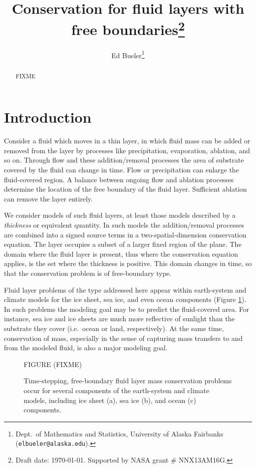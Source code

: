 \documentclass[final,leqno,onefignum,onetabnum]{siamltex1213bueler}
\title{Conservation for fluid layers with free boundaries\thanks{Draft date: \today.  Supported by NASA grant \# NNX13AM16G.}}
\author{Ed Bueler\thanks{Dept.~of Mathematics and Statistics, University of Alaska Fairbanks (\texttt{elbueler@alaska.edu}).}}
\begin{document}
\maketitle
{}

\begin{abstract}
FIXME
\end{abstract}


\pagestyle{myheadings}
\thispagestyle{plain}


\section{Introduction}  \label{sec:intro}

Consider a fluid which moves in a thin layer, in which fluid mass can be added or removed from the layer by processes like precipitation, evaporation, ablation, and so on.  Through flow and these addition/removal processes the area of substrate covered by the fluid can change in time.  Flow or precipitation can enlarge the fluid-covered region.  A balance between ongoing flow and ablation processes determine the location of the free boundary of the fluid layer.  Sufficient ablation can remove the layer entirely.

We consider models of such fluid layers, at least those models described by a \emph{thickness} or equivalent quantity.  In such models the addition/removal processes are combined into a signed source terms in a two-spatial-dimension conservation equation.  The layer occupies a subset of a larger fixed region of the plane.  The domain where the fluid layer is present, thus where the conservation equation applies, is the set where the thickness is positive.  This domain changes in time, so that the conservation problem is of free-boundary type.

Fluid layer problems of the type addressed here appear within earth-system and climate models for the ice sheet, sea ice, and even ocean components (Figure \ref{fig:climatepictures}).  In such problems the modeling goal may be to predict the fluid-covered area.  For instance, sea ice and ice sheets are much more reflective of sunlight than the substrate they cover (i.e.~ocean or land, respectively).  At the same time, conservation of mass, especially in the sense of capturing mass transfers to and from the modeled fluid, is also a major modeling goal.

\begin{figure}[ht]
\begin{center}
FIGURE (FIXME)
\end{center}
\caption{Time-stepping, free-boundary fluid layer mass conservation problems occur for several components of the earth-system and climate models, including ice sheet (a), sea ice (b), and ocean (c) components.}
\label{fig:climatepictures}
\end{figure}
\end{document}
